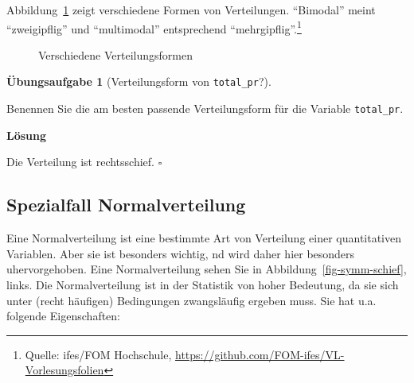 \documentclass[
  letterpaper,
  twoside,
  open=any]{scrbook}
\theoremstyle{definition}
\newtheorem{exercise}{Übungsaufgabe}[chapter]
\theoremstyle{definition}
\theoremstyle{definition}
\theoremstyle{remark}
\begin{document}
Abbildung~\ref{fig-plot-distribs} zeigt verschiedene Formen von
Verteilungen. \enquote{Bimodal} meint \enquote{zweigipflig} und
\enquote{multimodal} entsprechend \enquote{mehrgipflig}.\footnote{Quelle:
  ifes/FOM Hochschule,
  \url{https://github.com/FOM-ifes/VL-Vorlesungsfolien}}

\begin{figure}


\caption{\label{fig-plot-distribs}Verschiedene Verteilungsformen}

\end{figure}%

\begin{exercise}[Verteilungsform von
\texttt{total\_pr}?]\protect\hypertarget{exr-verteilungsform-total-pr}{}\label{exr-verteilungsform-total-pr}

Benennen Sie die am besten passende Verteilungsform für die Variable
\texttt{total\_pr}.

\textbf{Lösung}

Die Verteilung ist rechtsschief. \(\square\)

\end{exercise}

\subsection{Spezialfall
Normalverteilung}\label{spezialfall-normalverteilung}

Eine Normalverteilung ist eine bestimmte Art von Verteilung einer
quantitativen Variablen. Aber sie ist besonders wichtig, nd wird daher
hier besonders uhervorgehoben. Eine Normalverteilung sehen Sie in
Abbildung~\ref{fig-symm-schief}, links. Die Normalverteilung ist in der
Statistik von hoher Bedeutung, da sie sich unter (recht häufigen)
Bedingungen zwangsläufig ergeben muss. Sie hat u.a. folgende
Eigenschaften:
\end{document}
